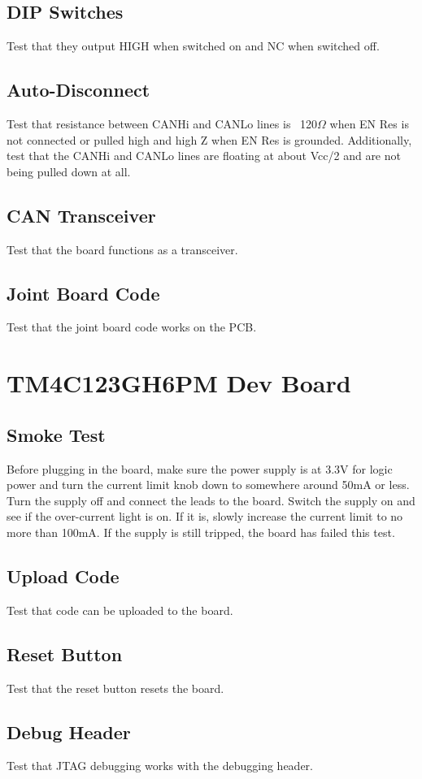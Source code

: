 \documentclass[12pt,letterpaper]{article}
\begin{document}
	\subsection{DIP Switches}
	Test that they output HIGH when switched on and NC when switched off.
	
	\subsection{Auto-Disconnect}
	Test that resistance between CANHi and CANLo lines is ~120$\Omega$ when EN Res is not connected or pulled high and high Z when EN Res is grounded. Additionally, test that the CANHi and CANLo lines are floating at about Vcc/2 and are not being pulled down at all.
	
	\subsection{CAN Transceiver}
	Test that the board functions as a transceiver.
	
	\subsection{Joint Board Code}
	Test that the joint board code works on the PCB.
	
	\newpage
	\section{TM4C123GH6PM Dev Board}
	\subsection{Smoke Test}
	Before plugging in the board, make sure the power supply is at 3.3V for logic power and turn the current limit knob down to somewhere around 50mA or less. Turn the supply off and connect the leads to the board. Switch the supply on and see if the over-current light is on. If it is, slowly increase the current limit to no more than 100mA. If the supply is still tripped, the board has failed this test.
	
	\subsection{Upload Code}
	Test that code can be uploaded to the board.
	
	\subsection{Reset Button}
	Test that the reset button resets the board.
	
	\subsection{Debug Header}
	Test that JTAG debugging works with the debugging header.
	
\end{document}
